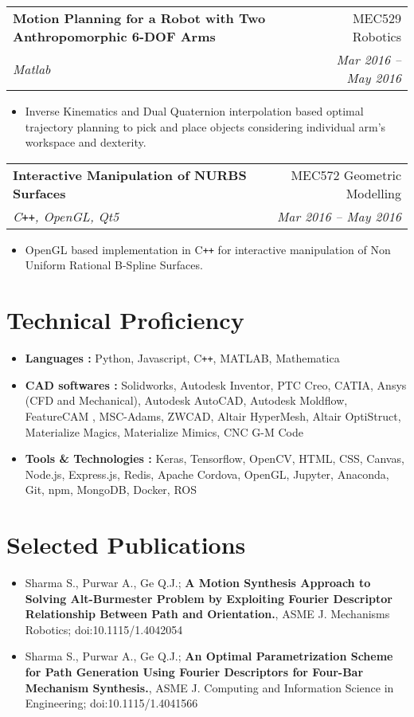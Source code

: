 \documentclass[letterpaper,10pt]{article}
\makeatletter
\newcommand{\resumeHeading}[4]{
  \vspace{-1pt}
    \begin{tabular*}{0.97\textwidth}{l@{\extracolsep{\fill}}r}
      \textbf{#1} & #2 \vspace{-2pt}\\ \vspace{1pt}
      \textit{\small#3} & \textit{\small #4} \\
    \end{tabular*}
}
\newcommand{\resumeSection}[1]{
\vspace{-12pt}
\section{\textbf{#1}}
}
\newcommand{\resumeItemListStart}{
\vspace{-7pt}
\begin{itemize}[leftmargin=14pt]
}
\newcommand{\resumeItemListEnd}{
\vspace{+7pt}
\end{itemize}
}
\newcommand{\resumeItem}[1]{
  \item\small{
      {#1 \vspace{-7pt}
      }
  }
}
\makeatother
\begin{document}
    \vspace{-2pt}
    \resumeHeading{Motion Planning for a Robot with Two Anthropomorphic 6-DOF Arms}{MEC529 Robotics}{Matlab}{Mar 2016 -- May 2016}
    \resumeItemListStart
    \resumeItem{Inverse Kinematics and Dual Quaternion interpolation based optimal trajectory planning to pick and place objects considering individual arm's workspace and dexterity.}
    \resumeItemListEnd
    
    \vspace{-2pt}
    \resumeHeading{Interactive Manipulation of NURBS Surfaces}{MEC572 Geometric Modelling}{C\texttt{++}, OpenGL, Qt5}{Mar 2016 -- May 2016}
    \resumeItemListStart
    \resumeItem{OpenGL based implementation in C\texttt{++} for interactive manipulation of Non Uniform Rational B-Spline Surfaces.}
    \resumeItemListEnd


\resumeSection{Technical Proficiency}
	\vspace{+7pt}
	\resumeItemListStart
	\resumeItem{\textbf{Languages :} Python, Javascript, C\texttt{++}, MATLAB, Mathematica}
	\resumeItem{\textbf{CAD softwares :} Solidworks, Autodesk Inventor, PTC Creo, CATIA, Ansys (CFD and Mechanical), Autodesk AutoCAD, Autodesk Moldflow, FeatureCAM , MSC-Adams, ZWCAD, Altair HyperMesh, Altair OptiStruct, Materialize Magics, Materialize Mimics, CNC G-M Code}
	\resumeItem{\textbf{Tools \& Technologies :} Keras, Tensorflow, OpenCV, HTML, CSS, Canvas, Node.js, Express.js, Redis, Apache Cordova, OpenGL, Jupyter, Anaconda, Git, npm, MongoDB, Docker, ROS}
	\resumeItemListEnd


\resumeSection{Selected Publications}
	\vspace{+7pt}
	\resumeItemListStart
	\resumeItem{Sharma S., Purwar A., Ge Q.J.; \textbf{A Motion Synthesis Approach to Solving Alt-Burmester Problem by Exploiting Fourier Descriptor Relationship Between Path and Orientation.}, ASME J. Mechanisms Robotics; doi:10.1115/1.4042054}
	\resumeItem{Sharma S., Purwar A., Ge Q.J.; \textbf{An Optimal Parametrization Scheme for Path Generation Using Fourier Descriptors for Four-Bar Mechanism Synthesis.}, ASME J. Computing and Information Science in Engineering; doi:10.1115/1.4041566}
	\resumeItemListEnd
\end{document}
